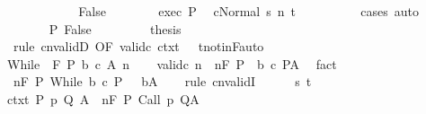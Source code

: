 \begin{isabellebody}
\ \ \ \ \isamarkupfalse%
\isanewline
\ \ \ \ \ \ \isamarkupfalse%
\ False\isanewline
\ \ \ \ \ \ \isamarkupfalse%
\ exec\ P\ \isamarkupfalse%
\ {\isachardoublequoteopen}{\isasymGamma}{\isasymturnstile}{\isasymlangle}c{}{\isacharcomma}Normal\ s{\isasymrangle}\ {\isacharequal}n{\isasymRightarrow}\ t{\isachardoublequoteclose}\isanewline
\ \ \ \ \ \ \ \ \isamarkupfalse%
\ cases\ auto\isanewline
\ \ \ \ \ \ \isamarkupfalse%
\ P\ False\ \isanewline
\ \ \ \ \ \ \isamarkupfalse%
\ {\isacharquery}thesis\isanewline
\ \ \ \ \ \ \ \ \isamarkupfalse%
\ {\isacharminus}\ {\isacharparenleft}rule\ cnvalidD\ {\isacharbrackleft}OF\ valid{\isacharunderscore}c{}\ ctxt\ {\isacharunderscore}\ {\isacharunderscore}\ t{\isacharunderscore}notin{\isacharunderscore}F{\isacharbrackright}{\isacharcomma}auto{\isacharparenright}\isanewline
\ \ \ \ \isamarkupfalse%
\isanewline
\ \ \isamarkupfalse%
\isanewline
{}\isamarkupfalse%
\isanewline
\ \ \isamarkupfalse%
\ {\isacharparenleft}While\ {\isasymTheta}\ F\ P\ b\ c\ A\ n{\isacharparenright}\isanewline
\ \ \isamarkupfalse%
\ valid{\isacharunderscore}c{\isacharcolon}\ {\isachardoublequoteopen}{\isasymAnd}n{\isachardot}\ {\isasymGamma}{\isacharcomma}{\isasymTheta}\ {\isasymTurnstile}n{\isacharcolon}\isactrlbsub {\isacharslash}F\isactrlesub \ {\isacharparenleft}P\ {\isasyminter}\ b{\isacharparenright}\ c\ P{\isacharcomma}A{\isachardoublequoteclose}\ \isamarkupfalse%
\ fact\isanewline
\ \ \isamarkupfalse%
\ {\isachardoublequoteopen}{\isasymGamma}{\isacharcomma}{\isasymTheta}\ {\isasymTurnstile}n{\isacharcolon}\isactrlbsub {\isacharslash}F\isactrlesub \ P\ While\ b\ c\ {\isacharparenleft}P\ {\isasyminter}\ {\isacharminus}\ b{\isacharparenright}{\isacharcomma}A{\isachardoublequoteclose}\isanewline
\ \ \isamarkupfalse%
\ {\isacharparenleft}rule\ cnvalidI{\isacharparenright}\isanewline
\ \ \ \ \isamarkupfalse%
\ s\ t\isanewline
\ \ \ \ \isamarkupfalse%
\ ctxt{\isacharcolon}\ {\isachardoublequoteopen}{\isasymforall}{\isacharparenleft}P{\isacharcomma}\ p{\isacharcomma}\ Q{\isacharcomma}\ A{\isacharparenright}{\isasymin}{\isasymTheta}{\isachardot}\ {\isasymGamma}\ {\isasymTurnstile}n{\isacharcolon}\isactrlbsub {\isacharslash}F\isactrlesub \ P\ {\isacharparenleft}Call\ p{\isacharparenright}\ Q{\isacharcomma}A{\isachardoublequoteclose}\isanewline

\end{isabellebody}
